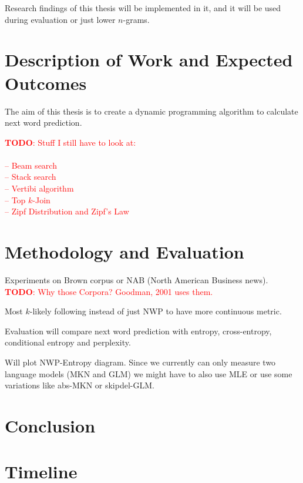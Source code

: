 \documentclass[11pt,a4paper]{article}
\newcommand{\todo}[1]{\textcolor{red}{\textbf{TODO}: #1}}
\begin{document}
Research findings of this thesis will be implemented in it, and it will be used
during evaluation or just lower $n$-grams.

\section{Description of Work and Expected Outcomes}

The aim of this thesis is to create a dynamic programming algorithm to calculate
next word prediction.

\todo{Stuff I still have to look at:\\
\\
-- Beam search \\
-- Stack search \\
-- Vertibi algorithm \\
-- Top $k$-Join \\
-- Zipf Distribution and Zipf's Law
}

\section{Methodology and Evaluation}

Experiments on Brown corpus or NAB (North American Business news).
\todo{Why those Corpora? Goodman, 2001 uses them.}

Most $k$-likely following instead of just NWP to have more continuous metric.

Evaluation will compare next word prediction with entropy, cross-entropy,
conditional entropy and perplexity.

Will plot NWP-Entropy diagram. Since we currently can only measure two language
models (MKN and GLM) we might have to also use MLE or use some variations like
abs-MKN or skipdel-GLM.

\section{Conclusion}

\section{Timeline}
\end{document}
